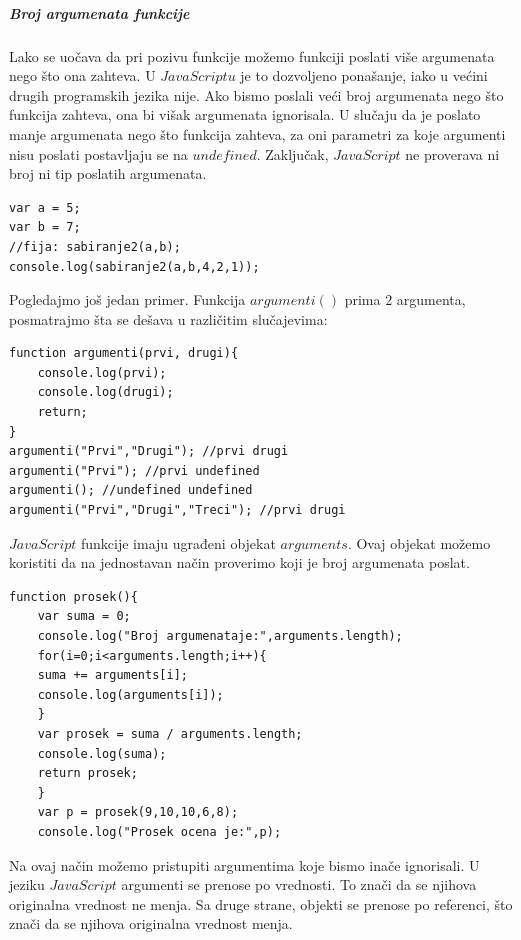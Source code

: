 \documentclass[a4paper]{article}
\begin{document}
\subparagraph{Broj argumenata funkcije}
Lako se uočava da pri pozivu funkcije možemo funkciji poslati više argumenata nego što ona zahteva. U $JavaScriptu$ je to dozvoljeno ponašanje, iako u većini drugih programskih jezika nije. Ako bismo poslali veći broj argumenata nego što funkcija zahteva, ona bi višak argumenata ignorisala. U slučaju da je poslato manje argumenata nego što funkcija zahteva, za oni parametri za koje argumenti nisu poslati postavljaju se na $undefined$. Zaključak, $JavaScript$ ne proverava ni broj ni tip poslatih argumenata.
\begin{lstlisting}[backgroundcolor = \color{lightgray}]
var a = 5;
var b = 7;
//fija: sabiranje2(a,b);
console.log(sabiranje2(a,b,4,2,1));
\end{lstlisting}
Pogledajmo još jedan primer.  Funkcija $argumenti()$ prima $2$ argumenta, posmatrajmo šta se dešava u različitim slučajevima:
\begin{lstlisting}[backgroundcolor = \color{lightgray}]
function argumenti(prvi, drugi){
	console.log(prvi);
	console.log(drugi);
    return;
}
argumenti("Prvi","Drugi"); //prvi drugi
argumenti("Prvi"); //prvi undefined
argumenti(); //undefined undefined
argumenti("Prvi","Drugi","Treci"); //prvi drugi	
\end{lstlisting}

$JavaScript$ funkcije imaju ugrađeni objekat $arguments$. Ovaj objekat možemo koristiti da na jednostavan način proverimo koji je broj argumenata poslat.
\begin{lstlisting}[backgroundcolor = \color{lightgray}]
 function prosek(){
	var suma = 0;
	console.log("Broj argumenataje:",arguments.length);
	for(i=0;i<arguments.length;i++){
    suma += arguments[i];
	console.log(arguments[i]);
    }
	var prosek = suma / arguments.length;
    console.log(suma);
	return prosek;
    }
	var p = prosek(9,10,10,6,8);
    console.log("Prosek ocena je:",p);	
\end{lstlisting}
Na ovaj način možemo pristupiti argumentima koje bismo inače ignorisali.
U jeziku $JavaScript$ argumenti se prenose po vrednosti. To znači da se njihova originalna vrednost ne menja. Sa druge strane, objekti se prenose po referenci, što znači da se njihova originalna vrednost menja.
\end{document}
